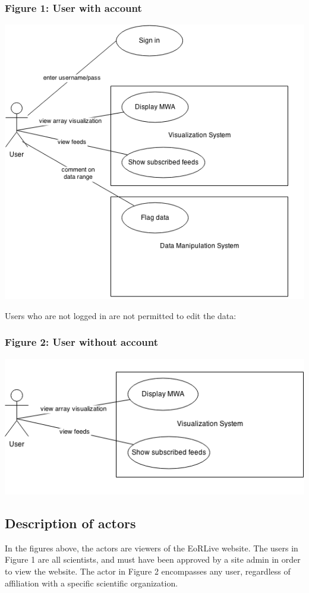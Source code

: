 \documentclass[12pt]{article}
\begin{document}
\begin{spacing}{1.5}
\subsubsection{Figure 1: User with account}
\begin{center}
\includegraphics{usecase1} %
\end{center}
\newpage
Users who are not logged in are not permitted to edit the data:
\subsubsection{Figure 2: User without account}
\begin{center}
\includegraphics{usecase2}
\end{center}

\subsection{Description of actors}
In the figures above, the actors are viewers of the EoRLive website. The users in Figure 1 are all scientists, and must have been approved by a site admin in order to view the website. The actor in Figure 2 encompasses any user, regardless of affiliation with a specific scientific organization. 


\end{spacing}
\end{document}
